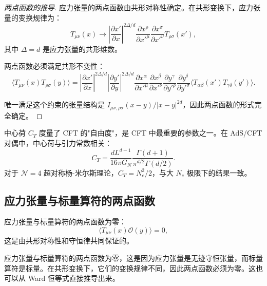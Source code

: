 \begin{proof}[两点函数的推导]
应力张量的两点函数由共形对称性确定。在共形变换下，应力张量的变换规律为：
\begin{equation}
    T_{\mu\nu}(x) \to \left|\frac{\partial x'}{\partial x}\right|^{2\Delta/d} \frac{\partial x^\rho}{\partial x'^\mu} \frac{\partial x^\sigma}{\partial x'^\nu} T_{\rho\sigma}(x'),
\end{equation}
其中 $\Delta = d$ 是应力张量的共形维数。

两点函数必须满足共形不变性：
\begin{equation}
    \langle T_{\mu\nu}(x) T_{\rho\sigma}(y) \rangle = \left|\frac{\partial x'}{\partial x}\right|^{2\Delta/d} \left|\frac{\partial y'}{\partial y}\right|^{2\Delta/d} \frac{\partial x^\alpha}{\partial x'^\mu} \frac{\partial x^\beta}{\partial x'^\nu} \frac{\partial y^\gamma}{\partial y'^\rho} \frac{\partial y^\delta}{\partial y'^\sigma} \langle T_{\alpha\beta}(x') T_{\gamma\delta}(y') \rangle.
\end{equation}

唯一满足这个约束的张量结构是 $I_{\mu\nu,\rho\sigma}(x-y) / |x-y|^{2d}$，因此两点函数的形式完全确定。
\end{proof}

\begin{note}
中心荷 $C_T$ 度量了 CFT 的"自由度"，是 CFT 中最重要的参数之一。在 AdS/CFT 对偶中，中心荷与引力常数相关：
\begin{equation}
    C_T = \frac{d L^{d-1}}{16\pi G_N} \frac{\Gamma(d+1)}{\pi^{d/2} \Gamma(d/2)}.
\end{equation}
对于 $\mathcal{N}=4$ 超对称杨-米尔斯理论，$C_T = N_c^2 / 2$，与大 $N_c$ 极限下的结果一致。
\end{note}

\subsection{应力张量与标量算符的两点函数}

应力张量与标量算符的两点函数为零：
\begin{equation}
    \langle T_{\mu\nu}(x) \mathcal{O}(y) \rangle = 0,
\end{equation}
这是由共形对称性和守恒律共同保证的。

\begin{remark}[两点函数为零的原因]
应力张量与标量算符的两点函数为零，这是因为应力张量是无迹守恒张量，而标量算符是标量。在共形变换下，它们的变换规律不同，因此两点函数必须为零。这也可以从 Ward 恒等式直接推导出来。
\end{remark}

